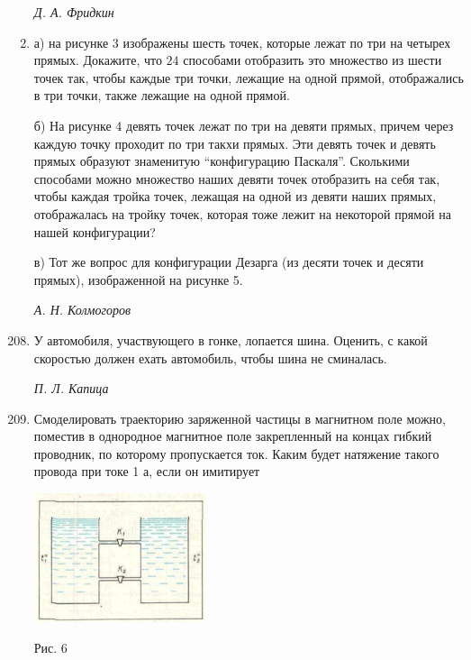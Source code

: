 \begin{enumerate}[label={М}{{\arabic*}}{.}, font=\bfseries, wide,  labelindent=0pt, noitemsep]
    \begin{flushright}
        \textit{Д. А. Фридкин}
    \end{flushright}
    
\item
    а) на рисунке 3 изображены шесть точек, которые лежат по три на четырех прямых. Докажите, что $24$ способами отобразить это множество из шести точек так, чтобы каждые три точки, лежащие на одной прямой, отображались в три точки, также лежащие на одной прямой. \par
    б) На рисунке 4 девять точек лежат по три на девяти прямых, причем через каждую точку проходит по три такхи прямых. Эти девять точек  и девять прямых образуют знаменитую “конфигурацию Паскаля”. Сколькими способами можно множество наших девяти точек отобразить на себя так, чтобы каждая тройка точек, лежащая на одной из девяти наших прямых, отображалась на тройку точек, которая тоже лежит на некоторой прямой на нашей конфигурации? \par
    в) Тот же вопрос для конфигурации Дезарга (из десяти точек и десяти прямых), изображенной на рисунке 5.
     
    \begin{flushright}
        \textit{А. Н. Колмогоров}
    \end{flushright}
\end{enumerate}    
 \begin{enumerate}[label={Ф}{{\arabic*}}{.}, font=\bfseries, wide,  labelindent=0pt, noitemsep]
\setcounter{enumi}{207}
    \item
    У автомобиля, участвующего в гонке, лопается шина. Оценить, с какой скоростью должен ехать автомобиль, чтобы шина не сминалась.
    
    \begin{flushright}
        \textit{П. Л. Капица}
    \end{flushright}
    
    \item
    Смоделировать траекторию заряженной частицы в магнитном поле можно, поместив в однородное магнитное поле закрепленный на концах гибкий проводник, по которому пропускается ток. Каким будет натяжение такого провода при токе 1 а, если он имитирует
    \begin{center}
         \includegraphics[width=190px]{pic6.png}
    \end{center}
    Рис. 6
    \newline
\end{enumerate}    

